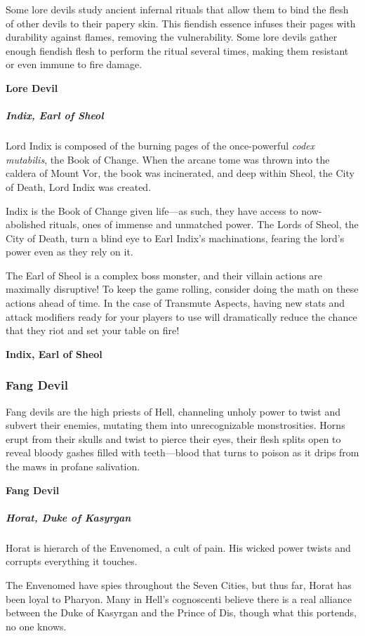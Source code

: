 \documentclass[10pt,a4paper,twoside,bg=print,twocolumn,openany,nodeprecatedcode]{dndbook}
\begin{document}
Some lore devils study ancient infernal rituals that allow them to bind the flesh of other devils to their papery skin. This fiendish essence infuses their pages with durability against flames, removing the vulnerability. Some lore devils gather enough fiendish flesh to perform the ritual several times, making them resistant or even immune to fire damage.

\textbf{Lore Devil}

\subparagraph{Indix, Earl of Sheol}
Lord Indix is composed of the burning pages of the once-powerful \textit{codex mutabilis}, the Book of Change. When the arcane tome was thrown into the caldera of Mount Vor, the book was incinerated, and deep within Sheol, the City of Death, Lord Indix was created.

Indix is the Book of Change given life—as such, they have access to now-abolished rituals, ones of immense and unmatched power. The Lords of Sheol, the City of Death, turn a blind eye to Earl Indix's machinations, fearing the lord's power even as they rely on it.

The Earl of Sheol is a complex boss monster, and their villain actions are maximally disruptive! To keep the game rolling, consider doing the math on these actions ahead of time. In the case of Transmute Aspects, having new stats and attack modifiers ready for your players to use will dramatically reduce the chance that they riot and set your table on fire!

\textbf{Indix, Earl of Sheol}

\subsubsection{Fang Devil}
Fang devils are the high priests of Hell, channeling unholy power to twist and subvert their enemies, mutating them into unrecognizable monstrosities. Horns erupt from their skulls and twist to pierce their eyes, their flesh splits open to reveal bloody gashes filled with teeth—blood that turns to poison as it drips from the maws in profane salivation.

\textbf{Fang Devil}

\subparagraph{Horat, Duke of Kasyrgan}
Horat is hierarch of the Envenomed, a cult of pain. His wicked power twists and corrupts everything it touches.

The Envenomed have spies throughout the Seven Cities, but thus far, Horat has been loyal to Pharyon. Many in Hell's cognoscenti believe there is a real alliance between the Duke of Kasyrgan and the Prince of Dis, though what this portends, no one knows.
\end{document}

